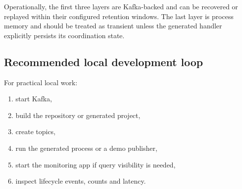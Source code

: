 Operationally, the first three layers are Kafka-backed and can be recovered or
replayed within their configured retention windows. The last layer is process
memory and should be treated as transient unless the generated handler explicitly
persists its coordination state.

\subsection{Recommended local development loop}

For practical local work:
\begin{enumerate}
\item start Kafka,
\item build the repository or generated project,
\item create topics,
\item run the generated process or a demo publisher,
\item start the monitoring app if query visibility is needed,
\item inspect lifecycle events, counts and latency.
\end{enumerate}
